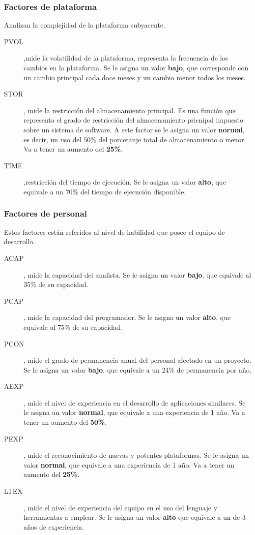\documentclass[11pt,a4paper,spanish,twoside]{book}
\begin{document}
\subsubsection{Factores de plataforma}
Analizan la complejidad de la plataforma subyacente.
\begin{description}
\item[PVOL],mide la volatilidad de la plataforma, representa la frecuencia de
  los cambios en la plataforma. Se le asigna un valor \textbf{bajo}, que
  corresponde con un cambio principal cada doce meses y un cambio menor todos
  los meses.

\item[STOR], mide la restricción del almacenamiento principal. Es una función
  que representa el grado de restricción del almacenamiento pricnipal
  impuesto sobre un sistema de software. A este factor se le asigna un valor
  \textbf{normal}, es decir, un uso del 50\% del porcetanje total de
  almacenamiento o menor. Va a tener un aumento del \textbf{25\%}.

\item[TIME],restricción del tiempo de ejecución. Se le asigna un valor
  \textbf{alto}, que equivale a un 70\% del tiempo de ejecución disponible.
\end{description}

\subsubsection{Factores de personal}
Estos factores están referidos al nivel de habilidad que posee el equipo de
desarrollo.
\begin{description}
\item[ACAP], mide la capacidad del analista. Se le asigna un valor
\textbf{bajo}, que equivale al 35\% de su capacidad.
\item[PCAP], mide la capacidad del programador. Se le asigna un valor
\textbf{alto}, que equivale al 75\% de su capacidad.
\item[PCON], mide el grado de permanencia anual del personal afectado en un
proyecto. Se le asigna un valor \textbf{bajo}, que equivale a un 24\% de
permanencia por año.
\item[AEXP], mide el nivel de experiencia en el desarrollo de aplicaciones
similares. Se le asigna un valor \textbf{normal}, que equivale a una
experiencia de 1 año. Va a tener un aumento del \textbf{50\%}.
\item[PEXP], mide el reconocimiento de nuevas y potentes plataformas. Se le
asigna un valor \textbf{normal}, que equivale a una experiencia de 1 año. Va
a tener un aumento del \textbf{25\%}.
\item[LTEX], mide el nivel de experiencia del equipo en el uso del lenguaje y
herramientas a emplear. Se le asigna un valor \textbf{alto} que equivale a un
de 3 años de experiencia.
\end{description}
\end{document}
